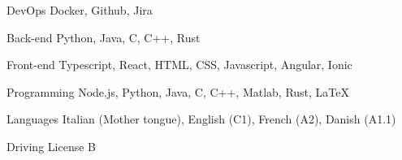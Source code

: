 

\begin{cvskills}


  \cvskill
    {DevOps} %
    {Docker, Github, Jira} %

  \cvskill
    {Back-end} %
    {Python, Java, C, C++, Rust} %

  \cvskill
    {Front-end} %
    {Typescript, React, HTML, CSS, Javascript, Angular, Ionic} %

  \cvskill
    {Programming} %
    {Node.js, Python, Java, C, C++, Matlab, Rust, LaTeX} %

  \cvskill
    {Languages} %
    {Italian (Mother tongue), English (C1), French (A2), Danish (A1.1)} %

  \cvskill
    {Driving License} %
    {B} %

\end{cvskills}
